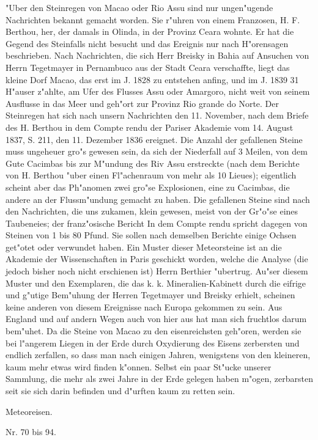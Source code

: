\documentclass[a4paper, 11pt, oneside, polutonikogreek, german]{article}
\begin{document}
{\footnotesize "Uber den Steinregen von Macao oder Rio Assu sind nur ungen"ugende Nachrichten bekannt gemacht worden. Sie r"uhren von einem Franzosen, H. F. Berthou, her, der damals in Olinda, in der Provinz Ceara wohnte. Er hat die Gegend des Steinfalls nicht besucht und das Ereignis nur nach H"orensagen beschrieben. Nach Nachrichten, die sich Herr Breisky in Bahia auf Ansuchen von Herrn Tegetmayer in Pernambuco aus der Stadt Ceara verschaffte, liegt das kleine Dorf Macao, das erst im J. 1828 zu entstehen anfing, und im J. 1839 31 H"auser z"ahlte, am Ufer des Flusses Assu oder Amargoro, nicht weit von seinem Ausflusse in das Meer und geh"ort zur Provinz Rio grande do Norte. Der Steinregen hat sich nach unsern Nachrichten den 11. November, nach dem Briefe des H. Berthou in dem Compte rendu der Pariser Akademie vom 14. August 1837, S. 211, den 11. Dezember 1836 ereignet. Die Anzahl der gefallenen Steine muss ungeheuer gro"s gewesen sein, da sich der Niederfall auf 3 Meilen, von dem Gute Cacimbas bis zur M"undung des Riv Assu erstreckte (nach dem Berichte von H. Berthou "uber einen Fl"achenraum von mehr als 10 Lieues); eigentlich scheint aber das Ph"anomen zwei gro"se Explosionen, eine zu Cacimbas, die andere an der Flussm"undung gemacht zu haben. Die gefallenen Steine sind nach den Nachrichten, die uns zukamen, klein gewesen, meist von der Gr"o"se eines Taubeneies; der franz"osische Bericht In dem Compte rendu spricht dagegen von Steinen von 1 bis 80 Pfund. Sie sollen nach demselben Berichte einige Ochsen get"otet oder verwundet haben. Ein Muster dieser Meteorsteine ist an die Akademie der Wissenschaften in Paris geschickt worden, welche die Analyse (die jedoch bisher noch nicht erschienen ist) Herrn Berthier "ubertrug. Au"ser diesem Muster und den Exemplaren, die das k. k. Mineralien-Kabinett durch die eifrige und g"utige Bem"uhung der Herren Tegetmayer und Breisky erhielt, scheinen keine anderen von diesem Ereignisse nach Europa gekommen zu sein. Aus England und auf andern Wegen auch von hier aus hat man sich fruchtlos darum bem"uhet. Da die Steine von Macao zu den eisenreichsten geh"oren, werden sie bei l"angerem Liegen in der Erde durch Oxydierung des Eisens zerbersten und endlich zerfallen, so dass man nach einigen Jahren, wenigstens von den kleineren, kaum mehr etwas wird finden k"onnen. Selbst ein paar St"ucke unserer Sammlung, die mehr als zwei Jahre in der Erde gelegen haben m"ogen, zerbarsten seit sie sich darin befinden und d"urften kaum zu retten sein.}

\setlength{\leftskip}{0pt}
\setlength{\parindent}{20pt}
\clearpage
\begin{center}
{\LARGE Meteoreisen.}

Nr. 70 bis 94.
\end{center}
\end{document}

